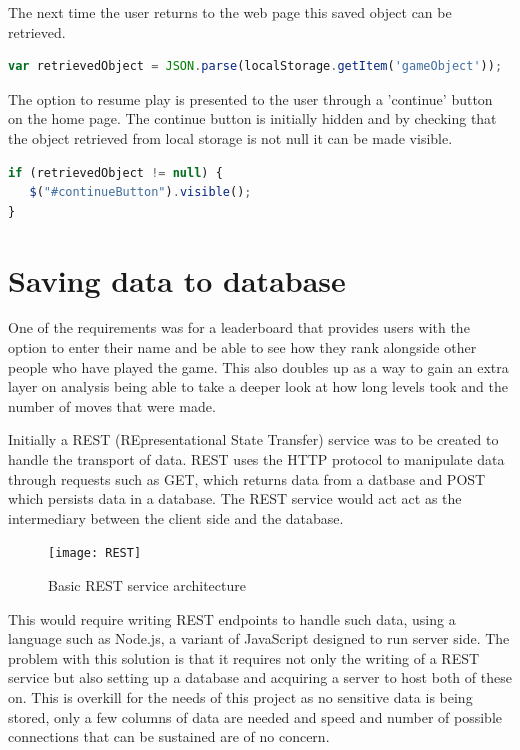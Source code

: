 \documentclass[12pt,a4paper]{report}
\begin{document}
The next time the user returns to the web page this saved object can be retrieved.
\begin{lstlisting}[language=JavaScript]
var retrievedObject = JSON.parse(localStorage.getItem('gameObject'));
\end{lstlisting}

The option to resume play is presented to the user through a 'continue' button on the home page. The continue button is initially hidden and by checking that the object retrieved from local storage is not null it can be made visible.

\begin{lstlisting}[language=JavaScript]
if (retrievedObject != null) {
   $("#continueButton").visible();
}
\end{lstlisting}

\section{Saving data to database}
One of the requirements was for a leaderboard that provides users with the option to enter their name and be able to see how they rank alongside other people who have played the game. This also doubles up as a way to gain an extra layer on analysis being able to take a deeper look at how long levels took and the number of moves that were made. 

Initially a REST (REpresentational State Transfer) service was to be created to handle the transport of data. REST uses the HTTP protocol to manipulate data through requests such as GET, which returns data from a datbase and POST which persists data in a database. The REST service would act act as the intermediary between the client side and the database.

\begin{figure}[h]
  \centering
  \begin{minipage}[b]{1\textwidth}
    \texttt{[image: REST]}
    \caption{Basic REST service architecture}
  \end{minipage}
\end{figure}
\FloatBarrier

This would require writing REST endpoints to handle such data, using a language such as Node.js, a variant of JavaScript designed to run server side. The problem with this solution is that it requires not only the writing of a REST service but also setting up a database and acquiring a server to host both of these on. This is overkill for the needs of this project as no sensitive data is being stored, only a few columns of data are needed and speed and number of possible connections that can be sustained are of no concern.
 
\end{document}
